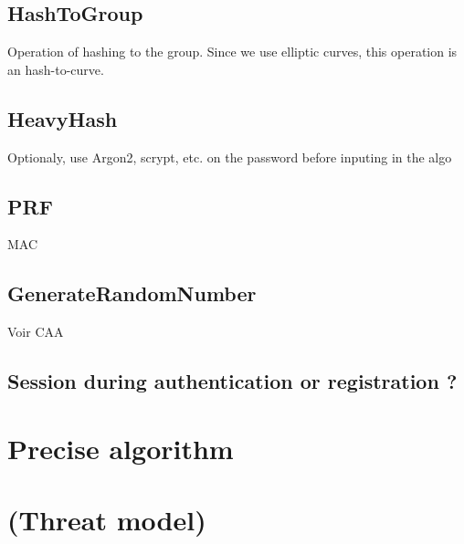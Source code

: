 \documentclass[../report.tex]{subfiles}
\begin{document}
\subsection{HashToGroup}
Operation of hashing to the group. Since we use elliptic curves, this operation is an hash-to-curve.

\subsection{HeavyHash}
Optionaly, use Argon2, scrypt, etc. on the password before inputing in the algo

\subsection{PRF}
MAC

\subsection{GenerateRandomNumber}
Voir CAA

\subsection{Session during authentication or registration ?}





\section{Precise algorithm}

\section{(Threat model)}
\end{document}
